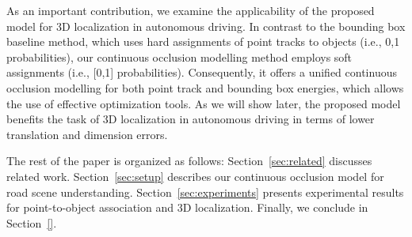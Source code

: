 As an important contribution, we examine the applicability of the proposed model for 3D localization in autonomous driving. In contrast to the bounding box baseline method, which uses hard assignments of point tracks to objects (i.e., {0,1} probabilities), our continuous occlusion modelling method employs soft assignments (i.e., [0,1] probabilities). Consequently, it offers a unified continuous occlusion modelling for both point track and bounding box energies, which allows the use of effective optimization tools. As we will show later, the proposed model benefits the task of 3D localization in autonomous driving in terms of lower translation and dimension errors.

The rest of the paper is organized as follows: Section~\ref{sec:related} discusses related work. Section~\ref{sec:setup} describes our continuous occlusion model for road scene understanding. Section~\ref{sec:experiments} presents experimental results for point-to-object association and 3D localization. Finally, we conclude in Section~\ref{}.




